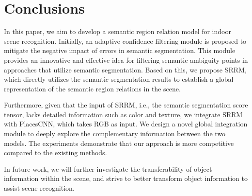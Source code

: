 \documentclass[conference]{IEEEtran}
\begin{document}
\section{Conclusions}

In this paper, we aim to develop a semantic region relation model for indoor  scene recognition. Initially, an adaptive confidence filtering module is proposed to mitigate the negative impact of errors in semantic segmentation. This module provides an innovative and effective idea for filtering semantic ambiguity points in approaches that utilize semantic segmentation. Based on this, we propose SRRM, which directly utilizes the semantic segmentation results to establish a global representation of the semantic region relations in the scene. 

Furthermore, given that the input of SRRM, i.e., the semantic segmentation score tensor, lacks detailed information such as color and texture, we integrate SRRM with PlacesCNN, which takes RGB as input. We design a novel global integration module to deeply explore the complementary information between  the two models.  The experiments demonstrate that our approach is more competitive compared to the existing methods.

In future work, we will further investigate the transferability of object information within the scene, and strive to better transform object information to assist scene recognition.



\end{document}
